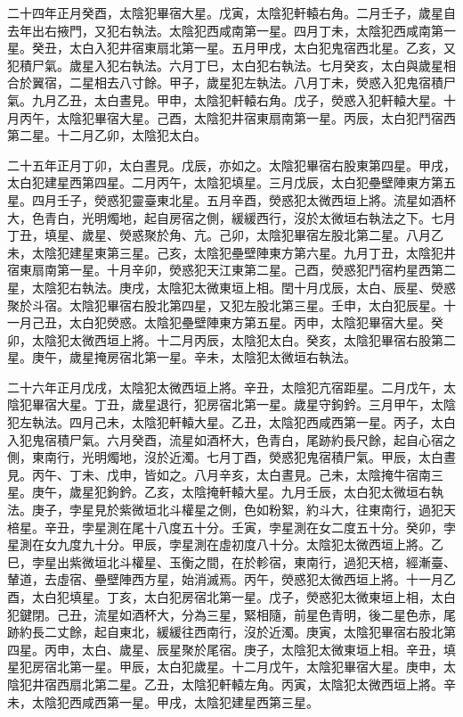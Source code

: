 \begin{pinyinscope}
 二十四年正月癸酉，太陰犯畢宿大星。戊寅，太陰犯軒轅右角。二月壬子，歲星自去年出右掖門，又犯右執法。太陰犯西咸南第一星。四月丁未，太陰犯西咸南第一星。癸丑，太白入犯井宿東扇北第一星。五月甲戌，太白犯鬼宿西北星。乙亥，又犯積尸氣。歲星入犯右執法。六月丁巳，太白犯右執法。七月癸亥，太白與歲星相合於翼宿，二星相去八寸餘。甲子，歲星犯左執法。八月丁未，熒惑入犯鬼宿積尸氣。九月乙丑，太白晝見。甲申，太陰犯軒轅右角。戊子，熒惑入犯軒轅大星。十月丙午，太陰犯畢宿大星。己酉，太陰犯井宿東扇南第一星。丙辰，太白犯鬥宿西第二星。十二月乙卯，太陰犯太白。



 二十五年正月丁卯，太白晝見。戊辰，亦如之。太陰犯畢宿右股東第四星。甲戌，太白犯建星西第四星。二月丙午，太陰犯填星。三月戊辰，太白犯壘壁陣東方第五星。四月壬子，熒惑犯靈臺東北星。五月辛酉，熒惑犯太微西垣上將。流星如酒杯大，色青白，光明燭地，起自房宿之側，緩緩西行，沒於太微垣右執法之下。七月丁丑，填星、歲星、熒惑聚於角、亢。己卯，太陰犯畢宿左股北第二星。八月乙未，太陰犯建星東第三星。己亥，太陰犯壘壁陣東方第六星。九月丁丑，太陰犯井宿東扇南第一星。十月辛卯，熒惑犯天江東第二星。己酉，熒惑犯鬥宿杓星西第二星，太陰犯右執法。庚戌，太陰犯太微東垣上相。閏十月戊辰，太白、辰星、熒惑聚於斗宿。太陰犯畢宿右股北第四星，又犯左股北第三星。壬申，太白犯辰星。十一月己丑，太白犯熒惑。太陰犯壘壁陣東方第五星。丙申，太陰犯畢宿大星。癸卯，太陰犯太微西垣上將。十二月丙辰，太陰犯太白。癸亥，太陰犯畢宿右股第二星。庚午，歲星掩房宿北第一星。辛未，太陰犯太微垣右執法。



 二十六年正月戊戌，太陰犯太微西垣上將。辛丑，太陰犯亢宿距星。二月戊午，太陰犯畢宿大星。丁丑，歲星退行，犯房宿北第一星。歲星守鉤鈐。三月甲午，太陰犯左執法。四月己未，太陰犯軒轅大星。乙丑，太陰犯西咸西第一星。丙子，太白入犯鬼宿積尸氣。六月癸酉，流星如酒杯大，色青白，尾跡約長尺餘，起自心宿之側，東南行，光明燭地，沒於近濁。七月丁酉，熒惑犯鬼宿積尸氣。甲辰，太白晝見。丙午、丁未、戊申，皆如之。八月辛亥，太白晝見。己未，太陰掩牛宿南三星。庚午，歲星犯鉤鈐。乙亥，太陰掩軒轅大星。九月壬辰，太白犯太微垣右執法。庚子，孛星見於紫微垣北斗權星之側，色如粉絮，約斗大，往東南行，過犯天棓星。辛丑，孛星測在尾十八度五十分。壬寅，孛星測在女二度五十分。癸卯，孛星測在女九度九十分。甲辰，孛星測在虛初度八十分。太陰犯太微西垣上將。乙巳，孛星出紫微垣北斗權星、玉衡之間，在於軫宿，東南行，過犯天棓，經漸臺、輦道，去虛宿、壘壁陣西方星，始消滅焉。丙午，熒惑犯太微西垣上將。十一月乙酉，太白犯填星。丁亥，太白犯房宿北第一星。戊子，熒惑犯太微東垣上相，太白犯鍵閉。己丑，流星如酒杯大，分為三星，緊相隨，前星色青明，後二星色赤，尾跡約長二丈餘，起自東北，緩緩往西南行，沒於近濁。庚寅，太陰犯畢宿右股北第四星。丙申，太白、歲星、辰星聚於尾宿。庚子，太陰犯太微東垣上相。辛丑，填星犯房宿北第一星。甲辰，太白犯歲星。十二月戊午，太陰犯畢宿大星。庚申，太陰犯井宿西扇北第二星。乙丑，太陰犯軒轅左角。丙寅，太陰犯太微西垣上將。辛未，太陰犯西咸西第一星。甲戌，太陰犯建星西第三星。




\end{pinyinscope}
